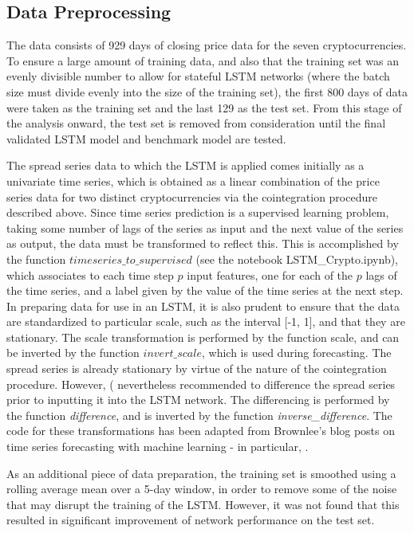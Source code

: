 \documentclass{article}
\begin{document}
\subsection{Data Preprocessing}

The data consists of 929 days of closing price data for the seven cryptocurrencies. To ensure a large amount of training data, and also that the training set was an evenly divisible number to allow for stateful LSTM networks (where the batch size must divide evenly into the size of the training set), the first 800 days of data were taken as the training set and the last 129 as the test set. From this stage of the analysis onward, the test set is removed from consideration until the final validated LSTM model and benchmark model are tested. 

The spread series data to which the LSTM is applied comes initially as a univariate time series, which is obtained as a linear combination of the price series data for two distinct cryptocurrencies via the cointegration procedure described above. Since time series prediction is a supervised learning problem, taking some number of lags of the series as input and the next value of the series as output, the data must be transformed to reflect this. This is accomplished by the function $timeseries\_to\_supervised$ (see the notebook LSTM\_Crypto.ipynb), which associates to each time step $p$ input features, one for each of the $p$ lags of the time series, and a label given by the value of the time series at the next step. In preparing data for use in an LSTM, it is also prudent to ensure that the data are standardized to particular scale, such as the interval [-1, 1], and that they are stationary. The scale transformation is performed by the function scale, and can be inverted by the function $invert\_scale$, which is used during forecasting. The spread series is already stationary by virtue of the nature of the cointegration procedure. However, ( \cite{dunis2006modelling} nevertheless recommended to difference the spread series prior to inputting it into the LSTM network. The differencing is performed by the function \textit{difference}, and is inverted by the function \textit{inverse\_difference}. The code for these transformations has been adapted from Brownlee's blog posts on time series forecasting with machine learning - in particular, \cite{brownlee2016time}. 

As an additional piece of data preparation, the training set is smoothed using a rolling average mean over a 5-day window, in order to remove some of the noise that may disrupt the training of the LSTM. However, it was not found that this resulted in significant improvement of network performance on the test set. 
\end{document}
